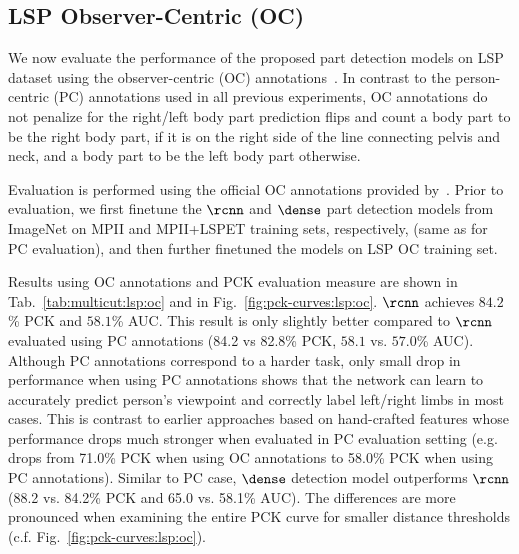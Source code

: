 

\subsection{LSP Observer-Centric (OC)}

We now evaluate the performance of the proposed part detection models
on LSP dataset using the observer-centric (OC)
annotations~\cite{eichner12accv}. In contrast to the person-centric
(PC) annotations used in all previous experiments, OC annotations do
not penalize for the right/left body part prediction flips and count a
body part to be the right body part, if it is on the right side of the
line connecting pelvis and neck, and a body part to be the left body part
otherwise.

Evaluation is performed using the official OC annotations provided
by~\cite{pishchulin13cvpr,eichner12accv}. Prior to evaluation, we
first finetune the $\rcnn$ and $\dense$ part detection models from
ImageNet on MPII and MPII+LSPET training sets, respectively, (same as
for PC evaluation), and then further finetuned the models on LSP OC
training set.

 Results using OC annotations and
PCK evaluation measure are shown in Tab.~\ref{tab:multicut:lsp:oc} and
in Fig.~\ref{fig:pck-curves:lsp:oc}. $\rcnn$ achieves $84.2$\% PCK and
$58.1$\% AUC. This result is only slightly better compared to $\rcnn$
evaluated using PC annotations (84.2 vs 82.8\% PCK, $58.1$
vs. $57.0$\% AUC). Although PC annotations correspond to a harder
task, only small drop in performance when using PC annotations shows
that the network can learn to accurately predict person's viewpoint and
correctly label left/right limbs in most cases. This is contrast to
earlier approaches based on hand-crafted features whose performance
drops much stronger when evaluated in PC evaluation setting
(e.g.~\cite{pishchulin13iccv} drops from 71.0\% PCK when using OC
annotations to 58.0\% PCK when using PC annotations). Similar to PC
case, $\dense$ detection model outperforms $\rcnn$ (88.2 vs. 84.2\%
PCK and 65.0 vs. 58.1\% AUC). The differences are more pronounced when
examining the entire PCK curve for smaller distance thresholds
(c.f. Fig.~\ref{fig:pck-curves:lsp:oc}).





